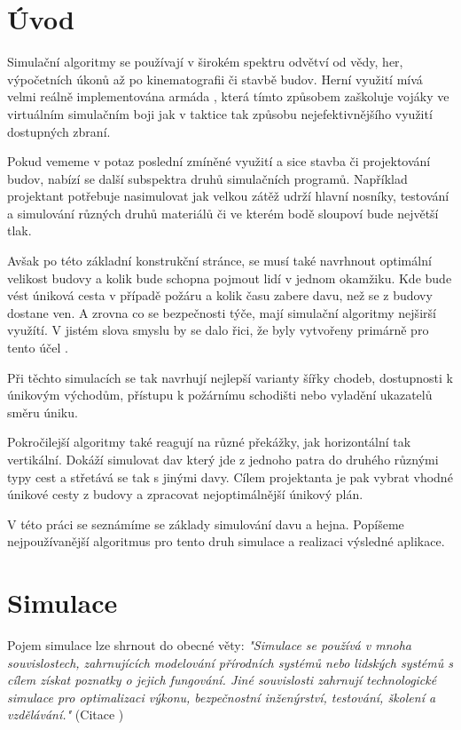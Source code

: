 \documentclass[czech,public,dept460,male,cpdeclaration]{diploma}
\begin{document}
\MakeTitlePages

\lstlistoflistings

\section{Úvod}
Simulační algoritmy se používají v širokém spektru odvětví od vědy, her, výpočetních úkonů až po kinematografii či stavbě budov. Herní využití mívá velmi reálně implementována armáda \cite{linkToArmySimulation}, která tímto způsobem zaškoluje vojáky ve virtuálním simulačním boji jak v taktice tak způsobu nejefektivnějšího využití dostupných zbraní. 

Pokud vememe v potaz poslední zmíněné využití a sice stavba či projektování budov, nabízí se další subspektra  druhů simulačních programů. Například projektant potřebuje nasimulovat jak velkou zátěž udrží hlavní nosníky, testování a simulování různých druhů materiálů či ve kterém bodě sloupoví bude největší tlak.

Avšak po této základní konstrukční stránce, se musí také navrhnout optimální velikost budovy a kolik bude schopna pojmout lidí v jednom okamžiku. Kde bude vést úniková cesta v případě požáru a kolik času zabere davu, než se z budovy dostane ven. A zrovna co se bezpečnosti týče, mají simulační algoritmy nejširší využítí. V jistém slova smyslu by se dalo řici,
že byly vytvořeny primárně pro tento účel \cite{link1}.

Při těchto simulacích se tak navrhují nejlepší varianty šířky chodeb, dostupnosti k únikovým východům, přístupu k požárnímu schodišti nebo vyladění ukazatelů směru
úniku.

Pokročilejší algoritmy také reagují na různé překážky, jak horizontální tak vertikální. Dokáží simulovat dav který jde z jednoho patra do druhého různými typy cest a střetává se tak s jinými davy. Cílem projektanta je pak vybrat vhodné únikové cesty z budovy a zpracovat nejoptimálnější únikový plán.

V této práci se seznámíme se základy simulování davu a hejna. Popíšeme nejpoužívanější algoritmus \cite{link2} pro tento druh simulace a realizaci výsledné aplikace.

\section{Simulace}
Pojem simulace lze shrnout do obecné věty: \textit{"Simulace se používá v mnoha souvislostech, zahrnujících modelování přírodních systémů nebo lidských systémů s cílem získat poznatky o jejich fungování. Jiné souvislosti zahrnují technologické simulace pro optimalizaci výkonu, bezpečnostní inženýrství, testování, školení a vzdělávání."} (Citace \cite{linkToSimulation})
\end{document}
